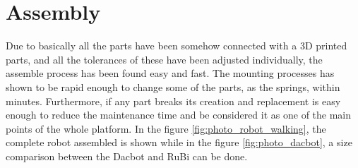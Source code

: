 \section{Assembly} %
\label{sec:assembly}
Due to basically all the parts have been somehow connected with a 3D printed parts, and all the tolerances of these have been adjusted individually, the assemble process has been found easy and fast.
The mounting processes has shown to be rapid enough to change some of the parts, as the springs, within minutes.
Furthermore, if any part breaks its creation and replacement is easy enough to reduce the maintenance time and be considered it as one of the main points of the whole platform.
In the figure \ref{fig:photo_robot_walking}, the complete robot assembled is shown while in the figure \ref{fig:photo_dacbot}, a size comparison between the Dacbot \cite{dacbot1} and RuBi can be done.

